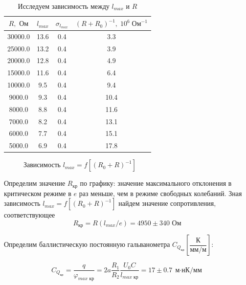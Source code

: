 \documentclass[a4paper, 12pt]{article}
\begin{document}
\begin{table}[H]
\centering
\begin{tabular}{|c|c|c|c|}
\hline
$R, \text{ Ом}$ & $l_{max}$ & $\sigma_{l_{max}}$ & $(R+R_0)^{-1}, \; 10^6 \; \text{Ом}^{-1}$ \\ \hline
30000.0         & 13.6      & 0.4                & 3.3            \\ \hline
25000.0         & 13.2      & 0.4                & 3.9            \\ \hline
20000.0         & 12.8      & 0.4                & 4.9            \\ \hline
15000.0         & 11.6      & 0.4                & 6.4            \\ \hline
10000.0         & 9.5       & 0.4                & 9.4            \\ \hline
9000.0          & 9.3       & 0.4                & 10.4           \\ \hline
8000.0          & 8.8       & 0.4                & 11.6           \\ \hline
7000.0          & 8.2       & 0.4                & 13.1           \\ \hline
6000.0          & 7.7       & 0.4                & 15.1           \\ \hline
5000.0          & 6.9       & 0.4                & 17.8           \\ \hline
\end{tabular}
\caption{Исследуем зависимость между $l_{max}$ и $R$}
\end{table}

\begin {figure}[H]
	\begin{center}
		\caption{Зависимость $l_{max} = f[(R_0+R)^{-1}]$}
	\end{center}
\end {figure}

Определим значение $R_\text{кр}$ по графику: значение максимального отклонения в критическом режиме в $e$ раз меньше, чем в режиме свободных колебаний. Зная зависимость $l_{max} = f[(R_0+R)^{-1}]$ найдем значение сопротивления, соответствующее 
$$R_\text{кр} = R(l_{max}/e) = 4950 \pm 340 \text{ Ом}$$

Определим баллистическую постоянную гальванометра $C_{Q_\text{кр}} \left[\dfrac{\text{К}}{\text{мм/м}} \right]$:

$$C_{Q_\text{кр}} = \dfrac{q}{\varphi_{max \text{ кр}}} = 2a \dfrac{R_1}{R_2} \dfrac{U_0C}{l_{max \text{ кр}}} = 17 \pm 0.7 \; \text{м$\cdot$нК/мм}$$
\end{document}
